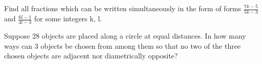 \item Find all fractions which can be written simultaneously in the form of forms $\frac{7k-5}{5k-3}$ and 
$\frac{6l-1}{4l-3}$ for some integers k, l.

\item Suppose 28 objects are placed along a circle at equal distances. In how many ways can 3 objects be chosen from among them so that no two of the three chosen objects are adjacent nor diametrically opposite?
